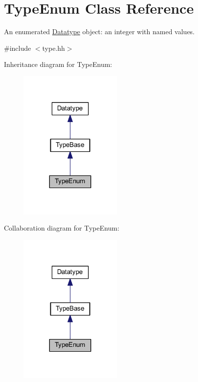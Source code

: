 \hypertarget{class_type_enum}{}\section{Type\+Enum Class Reference}
\label{class_type_enum}


An enumerated \mbox{\hyperlink{class_datatype}{Datatype}} object\+: an integer with named values.  




{\ttfamily \#include $<$type.\+hh$>$}



Inheritance diagram for Type\+Enum\+:
\nopagebreak
\begin{figure}[H]
\begin{center}
\leavevmode
\includegraphics[width=143pt]{class_type_enum__inherit__graph}
\end{center}
\end{figure}


Collaboration diagram for Type\+Enum\+:
\nopagebreak
\begin{figure}[H]
\begin{center}
\leavevmode
\includegraphics[width=143pt]{class_type_enum__coll__graph}
\end{center}
\end{figure}
